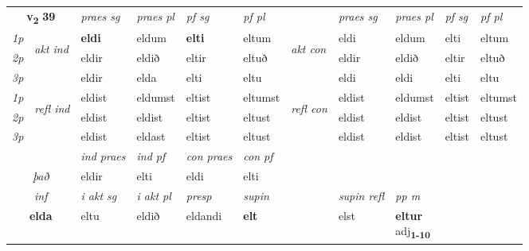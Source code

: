 \noindent
\begin{tabular}{lllllllllll} \toprule
\multicolumn{2}{c}{\textbf{v{\textsubscript{2}}} \Large{\textbf{39}}}  &  \textit{praes sg}  & \textit{praes pl}  &\textit{ pf sg} & \textit{pf pl} &  &  \textit{praes sg}  & \textit{praes pl}  & \textit{pf sg} & \textit{pf pl } \\*
	\cmidrule{3-6} \cmidrule{8-11}
 {\textit{1p}} & \multirow{3}{*}{\begin{turn}{90}\textit{akt ind}\end{turn}} & \textbf{eldi} & eldum & \textbf{elti} & eltum & \multirow{3}{*}{\begin{turn}{90}\textit{akt con}\end{turn}} &eldi & eldum & elti & eltum\\*
 {\textit{2p}} &  &  eldir  & eldið & eltir & eltuð & & eldir & eldið & eltir & eltuð \\*
{\textit{3p}} &  & eldir & elda & elti & eltu & & eldi & eldi& elti & eltu \\*
\cmidrule{3-6} \cmidrule{8-11}
 {\textit{1p}} & \multirow{3}{*}{\begin{turn}{90}\textit{refl ind}\end{turn}}  & eldist & eldumst & eltist & eltumst & \multirow{3}{*}{\begin{turn}{90}\textit{refl con}\end{turn}}  &eldist & eldumst & eltist & eltumst \\*
 {\textit{2p}} &  & eldist & eldist & eltist & eltust & &eldist & eldist & eltist & eltust \\*
 {\textit{3p}}  & & eldist & eldast & eltist & eltust & & eldist & eldist& eltist & eltust \\*
\cmidrule{3-6} \cmidrule{8-11}

   & &  \textit{ind praes} & \textit{ind pf} & \textit{con praes} & \textit{con pf} \\*
\multicolumn{2}{c}{ \textit{það} } & eldir & elti & eldi & elti \\*

\cmidrule{3-9}
   \multicolumn{2}{c}{\textit{inf}}  & \textit{i akt sg} & \textit{i akt pl}   & \textit{presp} & \textit{supin} && \textit{supin refl} & \textit{pp m} \\*
  \multicolumn{2}{c}{\textbf{elda}} & eltu  & eldið   & eldandi &  \textbf{elt} && elst & \specialcell{\textbf{eltur} \\ adj\textbf{\textsubscript{1-10}}} \\*
\end{tabular}

